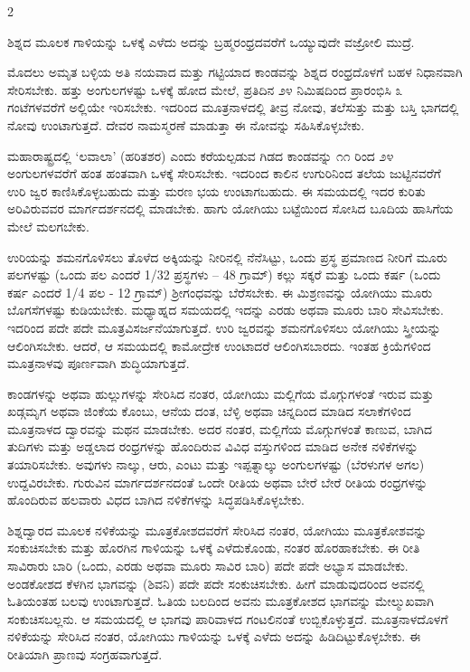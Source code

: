 \begin{multicols}{2}
\begin{kan}

ಶಿಶ್ನದ ಮೂಲಕ ಗಾಳಿಯನ್ನು ಒಳಕ್ಕೆ ಎಳೆದು ಅದನ್ನು ಬ್ರಹ್ಮರಂಧ್ರದವರೆಗೆ ಒಯ್ಯುವುದೇ ವಜ್ರೋಲಿ ಮುದ್ರೆ.
\vskip 7pt


ಮೊದಲು ಅಮೃತ ಬಳ್ಳಿಯ ಅತಿ ನಯವಾದ ಮತ್ತು ಗಟ್ಟಿಯಾದ ಕಾಂಡವನ್ನು ಶಿಶ್ನದ ರಂಧ್ರದೊಳಗೆ ಬಹಳ ನಿಧಾನವಾಗಿ ಸೇರಿಸಬೇಕು. ಹತ್ತು ಅಂಗುಲಗಳಷ್ಟು ಒಳಕ್ಕೆ ಹೋದ ಮೇಲೆ, ಪ್ರತಿದಿನ ೨೪ ನಿಮಿಷದಿಂದ ಪ್ರಾರಂಭಿಸಿ ೩ ಗಂಟೆಗಳವರೆಗೆ ಅಲ್ಲಿಯೇ ಇರಿಸಬೇಕು. ಇದರಿಂದ ಮೂತ್ರನಾಳದಲ್ಲಿ ತೀವ್ರ ನೋವು, ತಲೆಸುತ್ತು ಮತ್ತು ಬಸ್ತಿ ಭಾಗದಲ್ಲಿ ನೋವು ಉಂಟಾಗುತ್ತದೆ. ದೇವರ ನಾಮಸ್ಮರಣೆ ಮಾಡುತ್ತಾ ಈ ನೋವನ್ನು ಸಹಿಸಿಕೊಳ್ಳಬೇಕು.

ಮಹಾರಾಷ್ಟ್ರದಲ್ಲಿ ‘ಲವಾಲಾ’ (ಹರಿತಶರ) ಎಂದು ಕರೆಯಲ್ಪಡುವ ಗಿಡದ ಕಾಂಡವನ್ನು ೧೧ ರಿಂದ ೨೪ ಅಂಗುಲಗಳವರೆಗೆ ಹಂತ ಹಂತವಾಗಿ ಒಳಕ್ಕೆ ಸೇರಿಸಬೇಕು. ಇದರಿಂದ ಕಾಲಿನ ಉಗುರಿನಿಂದ ತಲೆಯ ಜುಟ್ಟಿನವರೆಗೆ ಉರಿ ಜ್ವರ ಕಾಣಿಸಿಕೊಳ್ಳಬಹುದು ಮತ್ತು ಮರಣ ಭಯ ಉಂಟಾಗಬಹುದು. ಈ ಸಮಯದಲ್ಲಿ ಇದರ ಕುರಿತು ಅರಿವಿರುವವರ ಮಾರ್ಗದರ್ಶನದಲ್ಲಿ ಮಾಡಬೇಕು. ಹಾಗು ಯೋಗಿಯು ಬಟ್ಟೆಯಿಂದ ಸೋಸಿದ ಬೂದಿಯ ಹಾಸಿಗೆಯ ಮೇಲೆ ಮಲಗಬೇಕು.

ಉರಿಯನ್ನು ಶಮನಗೊಳಿಸಲು ತೊಳೆದ ಅಕ್ಕಿಯನ್ನು ನೀರಿನಲ್ಲಿ ನೆನೆಸಿಟ್ಟು, ಒಂದು ಪ್ರಸ್ಥ ಪ್ರಮಾಣದ ನೀರಿಗೆ ಮೂರು ಪಲಗಳಷ್ಟು (ಒಂದು ಪಲ ಎಂದರೆ 1/32 ಪ್ರಸ್ಥಗಳು – 48 ಗ್ರಾಮ್) ಕಲ್ಲು ಸಕ್ಕರೆ ಮತ್ತು ಒಂದು ಕರ್ಷ (ಒಂದು ಕರ್ಷ ಎಂದರೆ 1/4 ಪಲ - 12 ಗ್ರಾಮ್) ಶ್ರೀಗಂಧವನ್ನು ಬೆರೆಸಬೇಕು. ಈ ಮಿಶ್ರಣವನ್ನು ಯೋಗಿಯು ಮೂರು ಬೊಗಸೆಗಳಷ್ಟು ಕುಡಿಯಬೇಕು. ಮಧ್ಯಾಹ್ನದ ಸಮಯದಲ್ಲಿ ಇದನ್ನು ಎರಡು ಅಥವಾ ಮೂರು ಬಾರಿ ಸೇವಿಸಬೇಕು. ಇದರಿಂದ ಪದೇ ಪದೇ ಮೂತ್ರವಿಸರ್ಜನೆಯಾಗುತ್ತದೆ. ಉರಿ ಜ್ವರವನ್ನು ಶಮನಗೊಳಿಸಲು ಯೋಗಿಯು ಸ್ತ್ರೀಯನ್ನು ಆಲಿಂಗಿಸಬೇಕು. ಆದರೆ, ಆ ಸಮಯದಲ್ಲಿ ಕಾಮೋದ್ರೇಕ ಉಂಟಾದರೆ ಆಲಿಂಗಿಸಬಾರದು. ಇಂತಹ ಕ್ರಿಯೆಗಳಿಂದ ಮೂತ್ರನಾಳವು ಪೂರ್ಣವಾಗಿ ಶುದ್ಧಿಯಾಗುತ್ತದೆ.

ಕಾಂಡಗಳನ್ನು ಅಥವಾ ಹುಲ್ಲುಗಳನ್ನು ಸೇರಿಸಿದ ನಂತರ, ಯೋಗಿಯು ಮಲ್ಲಿಗೆಯ ಮೊಗ್ಗುಗಳಂತೆ ಇರುವ ಮತ್ತು ಖಡ್ಗಮೃಗ ಅಥವಾ ಜಿಂಕೆಯ ಕೊಂಬು, ಆನೆಯ ದಂತ, ಬೆಳ್ಳಿ ಅಥವಾ ಚಿನ್ನದಿಂದ ಮಾಡಿದ ಸಲಾಕೆಗಳಿಂದ ಮೂತ್ರನಾಳದ ದ್ವಾರವನ್ನು ಮಥನ ಮಾಡಬೇಕು. ಅದರ ನಂತರ, ಮಲ್ಲಿಗೆಯ ಮೊಗ್ಗುಗಳಂತೆ ಕಾಣುವ, ಬಾಗಿದ ತುದಿಗಳು ಮತ್ತು ಅಡ್ಡಲಾದ ರಂಧ್ರಗಳನ್ನು ಹೊಂದಿರುವ ವಿವಿಧ ವಸ್ತುಗಳಿಂದ ಮಾಡಿದ ಅನೇಕ ನಳಿಕೆಗಳನ್ನು ತಯಾರಿಸಬೇಕು. ಅವುಗಳು ನಾಲ್ಕು, ಆರು, ಎಂಟು ಮತ್ತು ಇಪ್ಪತ್ನಾಲ್ಕು ಅಂಗುಲಗಳಷ್ಟು (ಬೆರಳುಗಳ ಅಗಲ) ಉದ್ದವಿರಬೇಕು. ಗುರುವಿನ ಮಾರ್ಗದರ್ಶನದಂತೆ ಒಂದೇ ರೀತಿಯ ಅಥವಾ ಬೇರೆ ಬೇರೆ ರೀತಿಯ ರಂಧ್ರಗಳನ್ನು ಹೊಂದಿರುವ ಹಲವಾರು ವಿಧದ ಬಾಗಿದ ನಳಿಕೆಗಳನ್ನು ಸಿದ್ಧಪಡಿಸಿಕೊಳ್ಳಬೇಕು.

ಶಿಶ್ನದ್ವಾರದ ಮೂಲಕ ನಳಿಕೆಯನ್ನು ಮೂತ್ರಕೋಶದವರೆಗೆ ಸೇರಿಸಿದ ನಂತರ, ಯೋಗಿಯು ಮೂತ್ರಕೋಶವನ್ನು ಸಂಕುಚಿಸಬೇಕು ಮತ್ತು ಹೊರಗಿನ ಗಾಳಿಯನ್ನು ಒಳಕ್ಕೆ ಎಳೆದುಕೊಂಡು, ನಂತರ ಹೊರಹಾಕಬೇಕು. ಈ ರೀತಿ ಸಾವಿರಾರು ಬಾರಿ (ಒಂದು, ಎರಡು ಅಥವಾ ಮೂರು ಸಾವಿರ ಬಾರಿ) ಪದೇ ಪದೇ ಅಭ್ಯಾಸ ಮಾಡಬೇಕು. ಅಂಡಕೋಶದ ಕೆಳಗಿನ ಭಾಗವನ್ನು (ಶಿವನಿ) ಪದೇ ಪದೇ ಸಂಕುಚಿಸಬೇಕು. ಹೀಗೆ ಮಾಡುವುದರಿಂದ ಅವನಲ್ಲಿ ಓತಿಯಂತಹ ಬಲವು ಉಂಟಾಗುತ್ತದೆ. ಓತಿಯ ಬಲದಿಂದ ಅವನು ಮೂತ್ರಕೋಶದ ಭಾಗವನ್ನು ಮೇಲ್ಮುಖವಾಗಿ ಸಂಕುಚಿಸಬಲ್ಲನು. ಆ ಸಮಯದಲ್ಲಿ ಆ ಭಾಗವು ಪಾರಿವಾಳದ ಗಂಟಲಿನಂತೆ ಉಬ್ಬಿಕೊಳ್ಳುತ್ತದೆ. ಮೂತ್ರನಾಳದೊಳಗೆ ನಳಿಕೆಯನ್ನು ಸೇರಿಸಿದ ನಂತರ, ಯೋಗಿಯು ಗಾಳಿಯನ್ನು ಒಳಕ್ಕೆ ಎಳೆದು ಅದನ್ನು ಹಿಡಿದಿಟ್ಟುಕೊಳ್ಳಬೇಕು. ಈ ರೀತಿಯಾಗಿ ಪ್ರಾಣವು ಸಂಗ್ರಹವಾಗುತ್ತದೆ.
\end{kan}
\end{multicols}

